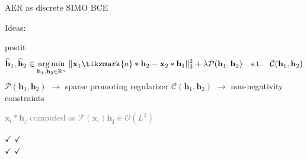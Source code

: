 \begin{frame}{AER as discrete SIMO BCE}
\begin{block}{Ideas:}
\begin{enumerate}
        \vspace*{.25em}

        \begin{beamercolorbox}[sep=.5em]{postit}
            \begin{equation*}
                \widehat{\mathbf{h}}_1, \widehat{\mathbf{h}}_2 \in
                \underset{\mathbf{h}_1, \mathbf{h}_2\in\kR^n}{\arg\min}\;
                \Vert \mathbf{x}_1 \tikzmark{a}\ast \mathbf{h}_2 - \mathbf{x}_2 \ast \mathbf{h}_1 \Vert_2^2
                + \lambda \mathcal{P}(\mathbf{h}_1, \mathbf{h}_2)
                \quad\text{s.t.}\quad\mathcal{C}(\mathbf{h}_1, \mathbf{h}_2)
            \end{equation*}
            \vspace{0.5em}
            \hfill {\footnotesize $\mathcal{P}(\mathbf{h}_1, \mathbf{h}_2)$ $\longrightarrow$ sparse promoting regularizer}
            \hfill {\footnotesize $\mathcal{C}(\mathbf{h}_1, \mathbf{h}_2)$ $\longrightarrow$ non-negativity constraints}
        \end{beamercolorbox}

    \end{enumerate}
    \textcolor{gray}{\small $\mathbf{x_i} \ast \mathbf{h}_j$ computed as $\mathcal{T}(\mathbf{x}_i) \mathbf{h_j} \in \mathcal{O}(L^2)$}

    \vfill
    \begin{center}
        \textcolor{mygreen}{$\checkmark$}  \cite{Lin2007} \qquad \textcolor{mygreen}{$\checkmark$} \cite{Aissa-El-Bey2008} \\
        \textcolor{mygreen}{$\checkmark$} \cite{Kowalczyk2013} \qquad \textcolor{mygreen}{$\checkmark$} \cite{Crocco2015}
    \end{center}

    \end{block}


 \end{frame}

